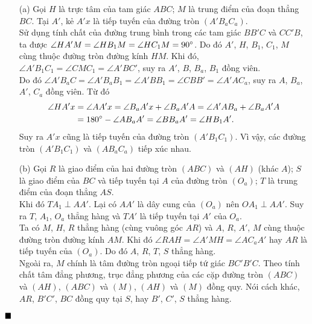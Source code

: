 \documentclass{article} %
\newenvironment{solution}[1][Lời giải]{%
  \proof[\faPenNib \hspace{0.2cm} \ttfamily \scshape \large #1]%
}{\(\hfill \blacksquare\){\parfillskip0pt\par}}
\begin{document}
        \begin{solution}
            \hfill
            \begin{enumerate}
                \item[(a)] Gọi \(H\) là trực tâm của tam giác \(ABC\); \(M\) là trung điểm của đoạn thẳng \(BC\). Tại \(A'\), kẻ \(A'x\) là tiếp tuyến của đường tròn \((A'B_aC_a)\).\\
                Sử dụng tính chất của đường trung bình trong các tam giác \(BB'C\) và \(CC'B\), ta được \(\angle HA'M = \angle HB_1M = \angle HC_1M = 90 \degree\). Do đó \(A'\), \(H\), \(B_1\), \(C_1\), \(M\) cùng thuộc đường tròn đường kính \(HM\). Khi đó, \(\angle A'B_1C_1 = \angle CMC_1 = \angle A'BC'\), suy ra \(A'\), \(B\), \(B_a\), \(B_1\) đồng viên.\\
                Do đó \(\angle A'B_aC = \angle A'B_aB_1 = \angle A'BB_1 = \angle CBB' = \angle A'AC_a\), suy ra \(A\), \(B_a\), \(A'\), \(C_a\) đồng viên. Từ đó
                \begin{equation}
                    \begin{aligned}
                        \angle HA'x &= \angle AA'x = \angle B_aA'x + \angle B_aA'A = \angle A'AB_a + \angle B_aA'A \\
                        &= 180 \degree - \angle AB_aA' = \angle BB_aA' = \angle HB_1A'.
                    \end{aligned}
                    \notag
                \end{equation}
                Suy ra \(A'x\) cũng là tiếp tuyến của đường tròn \((A'B_1C_1)\). Vì vậy, các đường tròn \((A'B_1C_1)\) và \((AB_aC_a)\) tiếp xúc nhau.
                \item[(b)] Gọi \(R\) là giao điểm của hai đường tròn \((ABC)\) và \((AH)\) (khác \(A\)); \(S\) là giao điểm của \(BC\) và tiếp tuyến tại \(A\) của đường tròn \((O_a)\); \(T\) là trung điểm của đoạn thẳng \(AS\).\\
                Khi đó \(TA_1 \perp AA'\). Lại có \(AA'\) là dây cung của \((O_a)\) nên \(OA_1 \perp AA'\). Suy ra \(T\), \(A_1\), \(O_a\) thẳng hàng và \(TA'\) là tiếp tuyến tại \(A'\) của \(O_a\).\\
                Ta có \(M\), \(H\), \(R\) thẳng hàng (cùng vuông góc \(AR\)) và \(A\), \(R\), \(A'\), \(M\) cùng thuộc đường tròn đường kính \(AM\). Khi đó \(\angle RAH = \angle A'MH = \angle AC_aA'\) hay \(AR\) là tiếp tuyến của \((O_a)\). Do đó \(A\), \(R\), \(T\), \(S\) thẳng hàng.\\
                Ngoài ra, \(M\) chính là tâm đường tròn ngoại tiếp tứ giác \(BC'B'C\). Theo tính chất tâm đẳng phương, trục đẳng phương của các cặp đường tròn \((ABC)\) và \((AH)\), \((ABC)\) và \((M)\), \((AH)\) và \((M)\) đồng quy. Nói cách khác, \(AR\), \(B'C'\), \(BC\) đồng quy tại \(S\), hay \(B'\), \(C'\), \(S\) thẳng hàng.\\

\end{enumerate}
\end{solution}
\end{document}
